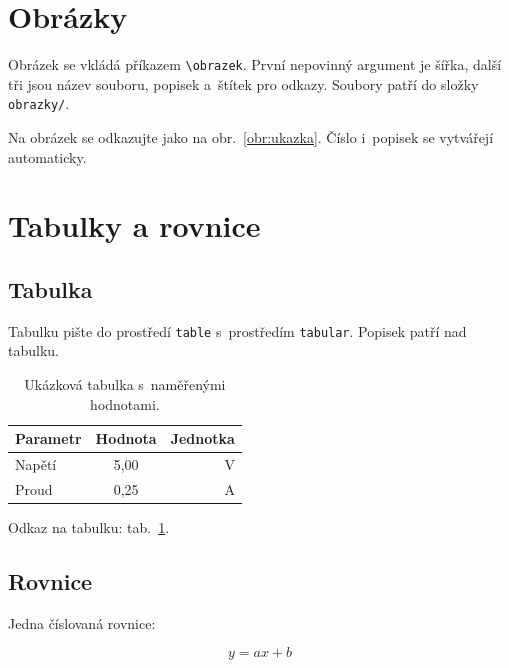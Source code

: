 \section{Obrázky}

Obrázek se vkládá příkazem \texttt{\textbackslash obrazek}. První
nepovinný argument je šířka, další tři jsou název souboru, popisek
a~štítek pro odkazy. Soubory patří do složky \texttt{obrazky/}.


Na obrázek se odkazujte jako na obr.~\ref{obr:ukazka}. Číslo i~popisek
se vytvářejí automaticky.


\section{Tabulky a rovnice}

\subsection{Tabulka}

Tabulku pište do prostředí \texttt{table} s~prostředím
\texttt{tabular}. Popisek patří nad tabulku.

\begin{table}[H]
  \centering
  \caption{Ukázková tabulka s~naměřenými hodnotami.}
  \label{tab:ukazka}
  \begin{tabular}{|l|c|r|}
    \hline
    \textbf{Parametr} & \textbf{Hodnota} & \textbf{Jednotka} \\ \hline
    Napětí & 5,00 & V \\ \hline
    Proud & 0,25 & A \\ \hline
  \end{tabular}
\end{table}

Odkaz na tabulku: tab.~\ref{tab:ukazka}.

\subsection{Rovnice}

Jedna číslovaná rovnice:

\begin{equation}
  y = a x + b
  \label{eq:ukazka}
\end{equation}

